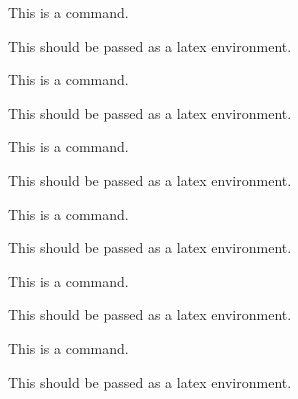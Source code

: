 This is a \latex command.

\begin{env}
This should be passed as a latex environment.
\end{env}

This is a \latex command.

\begin{env}
This should be passed as a latex environment.
\end{env}

This is a \latex command.

\begin{env}
This should be passed as a latex environment.
\end{env}

\begin{frame}[t]
This is a \latex command.

\begin{env}
This should be passed as a latex environment.
\end{env}

\end{frame}

\begin{frame}[t]
This is a \latex command.

\begin{env}
This should be passed as a latex environment.
\end{env}

\end{frame}

\begin{frame}[t]
This is a \latex command.

\begin{env}
This should be passed as a latex environment.
\end{env}

\end{frame}

